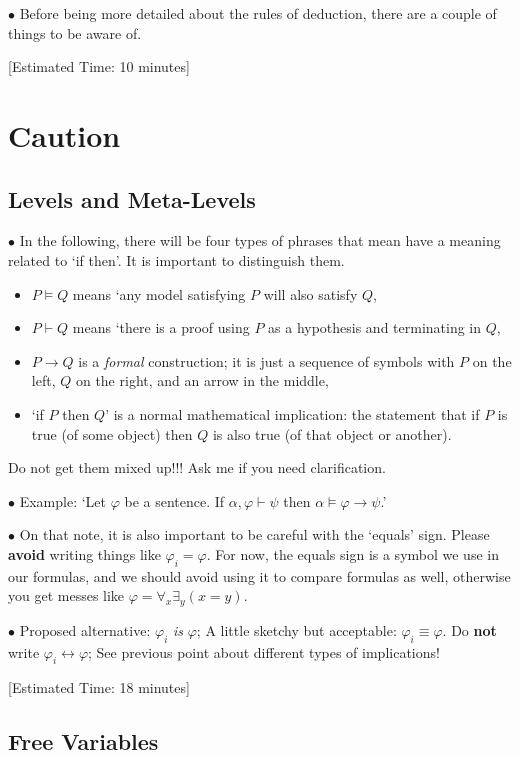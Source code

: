 \documentclass{article}
\newcommand\point[1]{\noindent \hspace{\labelsep} $\bullet$ #1 \smallskip}
\newcommand\timestamp[1]{\noindent \hspace{\labelsep} [Estimated Time: #1] \smallskip}
\begin{document}
\point{Before being more detailed about the rules of deduction, there are a couple of things to be aware of.}

\timestamp{10 minutes}

\section{Caution}

\subsection{Levels and Meta-Levels}

\point{In the following, there will be four types of phrases that mean have a meaning related to `if then'. It is important to distinguish them.
\begin{itemize}
\item $P \vDash Q$ means `any model satisfying $P$ will also satisfy $Q$,
\item $P \vdash Q$ means `there is a proof using $P$ as a hypothesis and terminating in $Q$,
\item $P \rightarrow Q$ is a \emph{formal} construction; it is just a sequence of symbols with $P$ on the left, $Q$ on the right, and an arrow in the middle,
\item `if $P$ then $Q$' is a normal mathematical implication: the statement that if $P$ is true (of some object) then $Q$ is also true (of that object or another).
\end{itemize}
Do not get them mixed up!!! Ask me if you need clarification.}

\point{Example: `Let $\varphi$ be a sentence. If $\alpha, \varphi \vdash \psi$ then $\alpha \vDash \varphi \rightarrow \psi$.'}

\point{On that note, it is also important to be careful with the `equals' sign. Please \textbf{avoid} writing things like $\varphi_i = \varphi$. For now, the equals sign is a symbol we use in our formulas, and we should avoid using it to compare formulas as well, otherwise you get messes like $\varphi = \forall_x \exists_y (x = y)$.}

\point{Proposed alternative: $\varphi_i$ \emph{is} $\varphi$; A little sketchy but acceptable: $\varphi_i \equiv \varphi$. Do \textbf{not} write $\varphi_i \leftrightarrow \varphi$; See previous point about different types of implications!}

\timestamp{18 minutes}

\subsection{Free Variables}
\end{document}
